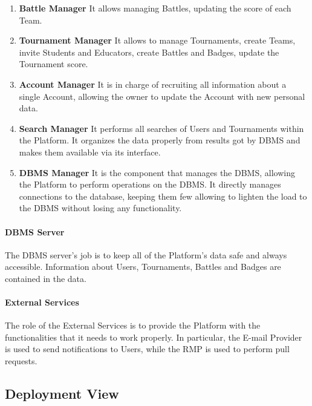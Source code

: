 \begin{enumerate}
    \item \textbf{Battle Manager} It allows managing Battles, updating the score of each Team.
    \item \textbf{Tournament Manager} It allows to manage Tournaments, create Teams, invite Students and Educators, create Battles and Badges, update the Tournament score.
    \item \textbf{Account Manager} It is in charge of recruiting all information about a single Account, allowing the owner to update the Account with new personal data.
    \item \textbf{Search Manager} It performs all searches of Users and Tournaments within the Platform. It organizes the data properly from results got by DBMS and makes them available via its interface.
    \item \textbf{DBMS Manager} It is the component that manages the DBMS, allowing the Platform to perform operations on the DBMS. It directly manages connections to the database, keeping them few allowing to lighten the load to the DBMS without losing any functionality.
\end{enumerate}
\newpage
{}
\newpage
\paragraph{DBMS Server}
The DBMS server's job is to keep all of the Platform's data safe and always accessible. Information about Users, Tournaments, Battles and Badges are contained in the data.

\paragraph{External Services}
The role of the External Services is to provide the Platform with the functionalities that it needs to work properly. In particular, the E-mail Provider is used to send notifications to Users, while the RMP is used to perform pull requests.            
\newpage

\subsection{Deployment View}

